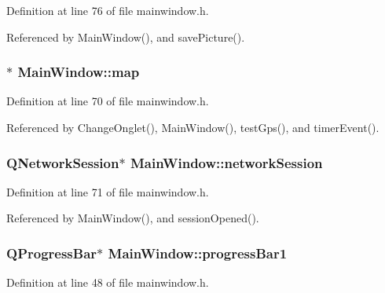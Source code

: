 Definition at line 76 of file mainwindow.\-h.



Referenced by Main\-Window(), and save\-Picture().

\hypertarget{classMainWindow_a2f9e7ca90c2813bd1969055871782cfb}{
\subsubsection[{map}]{$\ast$ Main\-Window\-::map\hspace{0.3cm}{\ttfamily [private]}}}\label{classMainWindow_a2f9e7ca90c2813bd1969055871782cfb}


Definition at line 70 of file mainwindow.\-h.



Referenced by Change\-Onglet(), Main\-Window(), test\-Gps(), and timer\-Event().

\hypertarget{classMainWindow_a638a10aec0de799787205387ee4da83e}{
\subsubsection[{network\-Session}]{\setlength{\rightskip}{0pt plus 5cm}Q\-Network\-Session$\ast$ Main\-Window\-::network\-Session\hspace{0.3cm}{\ttfamily [private]}}}\label{classMainWindow_a638a10aec0de799787205387ee4da83e}


Definition at line 71 of file mainwindow.\-h.



Referenced by Main\-Window(), and session\-Opened().

\hypertarget{classMainWindow_a50d8f5aa716821eca4ad0a3bfb0cf2ec}{
\subsubsection[{progress\-Bar1}]{\setlength{\rightskip}{0pt plus 5cm}Q\-Progress\-Bar$\ast$ Main\-Window\-::progress\-Bar1}}\label{classMainWindow_a50d8f5aa716821eca4ad0a3bfb0cf2ec}


Definition at line 48 of file mainwindow.\-h.




